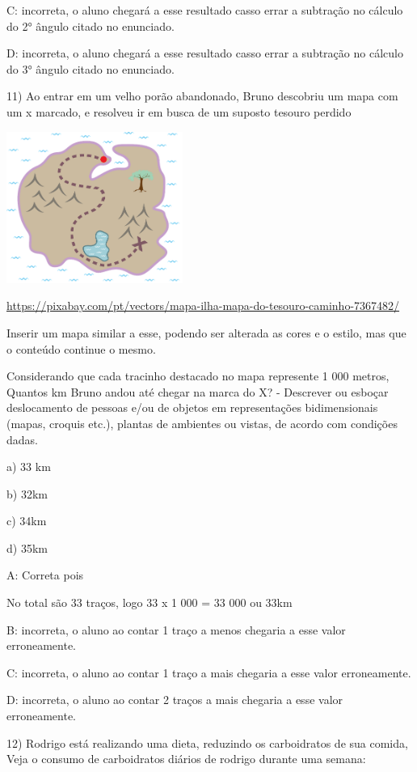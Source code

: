 C: incorreta, o aluno chegará a esse resultado casso errar a subtração
no cálculo do 2° ângulo citado no enunciado.

D: incorreta, o aluno chegará a esse resultado casso errar a subtração
no cálculo do 3° ângulo citado no enunciado.

11) Ao entrar em um velho porão abandonado, Bruno descobriu um mapa com
um x marcado, e resolveu ir em busca de um suposto tesouro perdido

\includegraphics[width=2.27099in,height=1.95in]{./imgSAEB_8_MAT/media/image61.png}

\url{https://pixabay.com/pt/vectors/mapa-ilha-mapa-do-tesouro-caminho-7367482/}

Inserir um mapa similar a esse, podendo ser alterada as cores e o
estilo, mas que o conteúdo continue o mesmo.

Considerando que cada tracinho destacado no mapa represente 1 000
metros, Quantos km Bruno andou até chegar na marca do X? - Descrever ou
esboçar deslocamento de pessoas e/ou de objetos em representações
bidimensionais (mapas, croquis etc.), plantas de ambientes ou vistas, de
acordo com condições dadas.

a) 33 km

b) 32km

c) 34km

d) 35km

A: Correta pois

No total são 33 traços, logo 33 x 1 000 = 33 000 ou 33km

B: incorreta, o aluno ao contar 1 traço a menos chegaria a esse valor
erroneamente.

C: incorreta, o aluno ao contar 1 traço a mais chegaria a esse valor
erroneamente.

D: incorreta, o aluno ao contar 2 traços a mais chegaria a esse valor
erroneamente.

12) Rodrigo está realizando uma dieta, reduzindo os carboidratos de sua
comida, Veja o consumo de carboidratos diários de rodrigo durante uma
semana:


